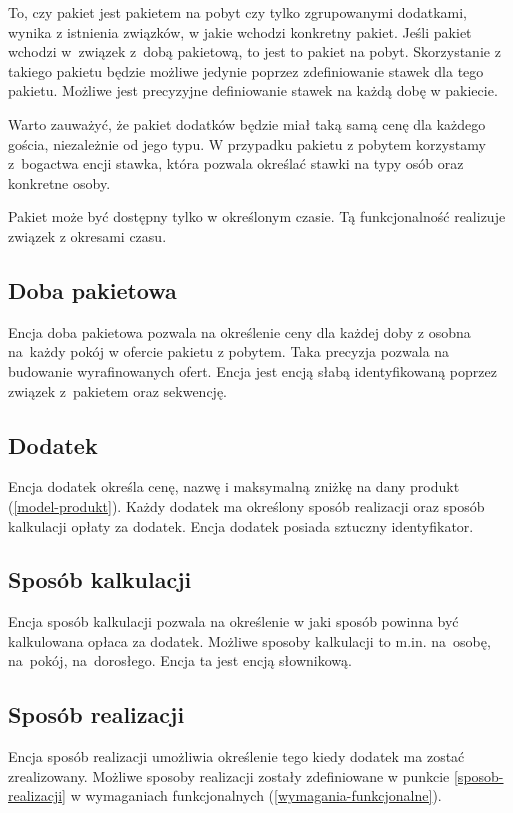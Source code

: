 \documentclass[a4paper,onecolumn,oneside,11pt,wide,floatssmall]{mwrep}
\theoremstyle{definition}
\theoremstyle{plain}%
\theoremstyle{remark}
\begin{document}
To, czy pakiet jest pakietem na pobyt czy tylko zgrupowanymi dodatkami, wynika z istnienia związków, w jakie wchodzi konkretny pakiet. Jeśli pakiet wchodzi \mbox{w związek} \mbox{z dobą} pakietową, to jest to pakiet na pobyt. Skorzystanie z takiego pakietu będzie możliwe jedynie poprzez zdefiniowanie stawek dla tego pakietu. Możliwe jest precyzyjne definiowanie stawek na każdą dobę w pakiecie.

Warto zauważyć, że pakiet dodatków będzie miał taką samą cenę dla każdego gościa, niezależnie od jego typu. W przypadku pakietu z pobytem korzystamy \mbox{z bogactwa} encji stawka, która pozwala określać stawki na typy osób oraz konkretne osoby.

Pakiet może być dostępny tylko w określonym czasie. Tą funkcjonalność realizuje związek z okresami czasu.

\subsection{Doba pakietowa}
\label{noc-pakietowa}
Encja doba pakietowa pozwala na określenie ceny dla każdej doby z osobna \mbox{na każdy} pokój w ofercie pakietu z pobytem. Taka precyzja pozwala na budowanie wyrafinowanych ofert. Encja jest encją słabą identyfikowaną poprzez związek \mbox{z pakietem} oraz sekwencję.

\subsection{Dodatek}
Encja dodatek określa cenę, nazwę i maksymalną zniżkę na dany produkt (\ref{model-produkt}). Każdy dodatek ma określony sposób realizacji oraz sposób kalkulacji opłaty za dodatek. Encja dodatek posiada sztuczny identyfikator.

\subsection{Sposób kalkulacji}
Encja sposób kalkulacji pozwala na określenie w jaki sposób powinna być kalkulowana opłaca za dodatek. Możliwe sposoby kalkulacji to m.in. \mbox{na osobę}, \mbox{na pokój}, \mbox{na dorosłego}. Encja ta jest encją słownikową.

\subsection{Sposób realizacji}
Encja sposób realizacji umożliwia określenie tego kiedy dodatek ma zostać zrealizowany. Możliwe sposoby realizacji zostały zdefiniowane w punkcie \ref{sposob-realizacji} w wymaganiach funkcjonalnych (\ref{wymagania-funkcjonalne}).
\end{document}
